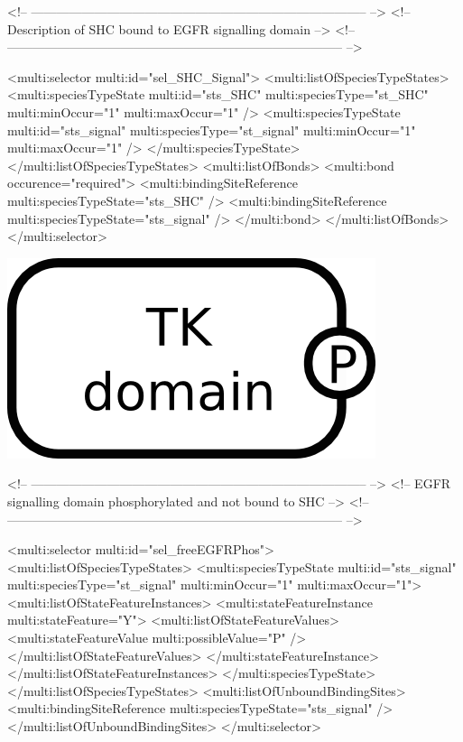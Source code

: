 \begin{example}
<!-- -------------------------------------------------------------------------------- -->
<!-- Description of SHC bound to EGFR signalling domain                               -->
<!-- -------------------------------------------------------------------------------- -->

      <multi:selector multi:id="sel_SHC_Signal">
        <multi:listOfSpeciesTypeStates>
          <multi:speciesTypeState multi:id="sts_SHC" multi:speciesType="st_SHC" 
                                   multi:minOccur="1" multi:maxOccur="1" />
          <multi:speciesTypeState multi:id="sts_signal" multi:speciesType="st_signal" 
                                   multi:minOccur="1" multi:maxOccur="1" />
          </multi:speciesTypeState>
        </multi:listOfSpeciesTypeStates>
        <multi:listOfBonds>
          <multi:bond occurence="required">
            <multi:bindingSiteReference multi:speciesTypeState="sts_SHC" />
            <multi:bindingSiteReference multi:speciesTypeState="sts_signal" />
          </multi:bond>
        </multi:listOfBonds>
      </multi:selector>
\end{example}

\includegraphics{figs/pngs/sel_freeEGFRPhos.png}

\begin{example}
<!-- -------------------------------------------------------------------------------- -->
<!-- EGFR signalling domain phosphorylated and not bound to SHC                       --> 
<!-- -------------------------------------------------------------------------------- -->

      <multi:selector multi:id="sel_freeEGFRPhos">
        <multi:listOfSpeciesTypeStates>
          <multi:speciesTypeState multi:id="sts_signal" multi:speciesType="st_signal" 
                                   multi:minOccur="1" multi:maxOccur="1">
            <multi:listOfStateFeatureInstances>
              <multi:stateFeatureInstance multi:stateFeature="Y">
                <multi:listOfStateFeatureValues>
                  <multi:stateFeatureValue multi:possibleValue="P" />
                </multi:listOfStateFeatureValues>
              </multi:stateFeatureInstance>
            </multi:listOfStateFeatureInstances>
          </multi:speciesTypeState>
        </multi:listOfSpeciesTypeStates>
        <multi:listOfUnboundBindingSites>
          <multi:bindingSiteReference multi:speciesTypeState="sts_signal" />
        </multi:listOfUnboundBindingSites>
      </multi:selector>
\end{example}

